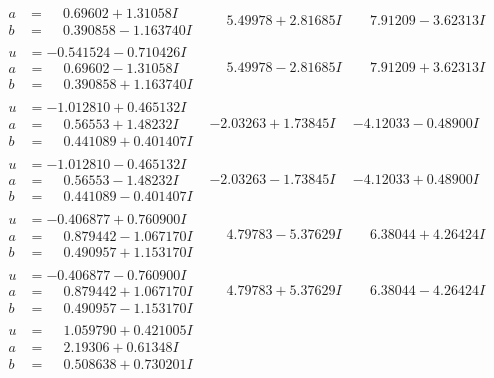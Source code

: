\documentclass[1p]{elsarticle_modified}
\theoremstyle{definition}
\begin{document}
$$\begin{array}{c|c|c}
\begin{aligned}
a &= \phantom{-}0.69602 + 1.31058 I \\
b &= \phantom{-}0.390858 - 1.163740 I\end{aligned}
 & \phantom{-}5.49978 + 2.81685 I & \phantom{-}7.91209 - 3.62313 I \\ \hline\begin{aligned}
u &= -0.541524 - 0.710426 I \\
a &= \phantom{-}0.69602 - 1.31058 I \\
b &= \phantom{-}0.390858 + 1.163740 I\end{aligned}
 & \phantom{-}5.49978 - 2.81685 I & \phantom{-}7.91209 + 3.62313 I \\ \hline\begin{aligned}
u &= -1.012810 + 0.465132 I \\
a &= \phantom{-}0.56553 + 1.48232 I \\
b &= \phantom{-}0.441089 + 0.401407 I\end{aligned}
 & -2.03263 + 1.73845 I & -4.12033 - 0.48900 I \\ \hline\begin{aligned}
u &= -1.012810 - 0.465132 I \\
a &= \phantom{-}0.56553 - 1.48232 I \\
b &= \phantom{-}0.441089 - 0.401407 I\end{aligned}
 & -2.03263 - 1.73845 I & -4.12033 + 0.48900 I \\ \hline\begin{aligned}
u &= -0.406877 + 0.760900 I \\
a &= \phantom{-}0.879442 - 1.067170 I \\
b &= \phantom{-}0.490957 + 1.153170 I\end{aligned}
 & \phantom{-}4.79783 - 5.37629 I & \phantom{-}6.38044 + 4.26424 I \\ \hline\begin{aligned}
u &= -0.406877 - 0.760900 I \\
a &= \phantom{-}0.879442 + 1.067170 I \\
b &= \phantom{-}0.490957 - 1.153170 I\end{aligned}
 & \phantom{-}4.79783 + 5.37629 I & \phantom{-}6.38044 - 4.26424 I \\ \hline\begin{aligned}
u &= \phantom{-}1.059790 + 0.421005 I \\
a &= \phantom{-}2.19306 + 0.61348 I \\
b &= \phantom{-}0.508638 + 0.730201 I\end{aligned}

\end{array}$$
\end{document}
